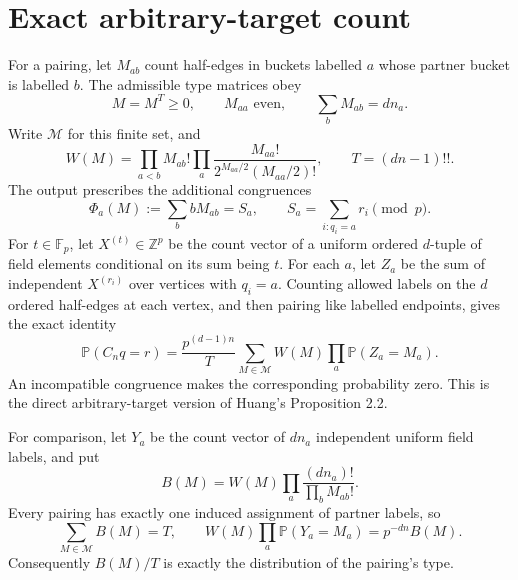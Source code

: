 \documentclass[11pt]{article}
\newcommand{\Fp}{\mathbb F_p}
\newcommand{\Prob}{\mathbb P}
\begin{document}
\section{Exact arbitrary-target count}
For a pairing, let $M_{ab}$ count half-edges in buckets labelled $a$
whose partner bucket is labelled $b$. The admissible type matrices obey
\[
 M=M^T\ge0,\qquad M_{aa}\text{ even},\qquad
 \sum_bM_{ab}=dn_a.
\]
Write $\mathcal M$ for this finite set, and
\[
 W(M)=\prod_{a<b}M_{ab}!\prod_a
       \frac{M_{aa}!}{2^{M_{aa}/2}(M_{aa}/2)!},
 \qquad T=(dn-1)!!.
\]
The output prescribes the additional congruences
\[
 \Phi_a(M):=\sum_b bM_{ab}=S_a,
 \qquad S_a=\sum_{i:q_i=a}r_i\pmod p.
\]
For $t\in\Fp$, let $X^{(t)}\in\mathbb Z^p$ be the count vector of a
uniform ordered $d$-tuple of field elements conditional on its sum being
$t$. For each $a$, let $Z_a$ be the sum of independent $X^{(r_i)}$ over
vertices with $q_i=a$. Counting allowed labels on the $d$ ordered
half-edges at each vertex, and then pairing like labelled endpoints,
gives the exact identity
\begin{equation}\label{eq:exact}
 \Prob(C_nq=r)=\frac{p^{(d-1)n}}{T}
       \sum_{M\in\mathcal M}W(M)\prod_a\Prob(Z_a=M_a).
\end{equation}
An incompatible congruence makes the corresponding probability zero.
This is the direct arbitrary-target version of Huang's Proposition 2.2.

For comparison, let $Y_a$ be the count vector of $dn_a$ independent
uniform field labels, and put
\[
 B(M)=W(M)\prod_a\frac{(dn_a)!}{\prod_bM_{ab}!}.
\]
Every pairing has exactly one induced assignment of partner labels, so
\begin{equation}\label{eq:baseline}
 \sum_{M\in\mathcal M}B(M)=T,\qquad
 W(M)\prod_a\Prob(Y_a=M_a)=p^{-dn}B(M).
\end{equation}
Consequently $B(M)/T$ is exactly the distribution of the pairing's type.
\end{document}
